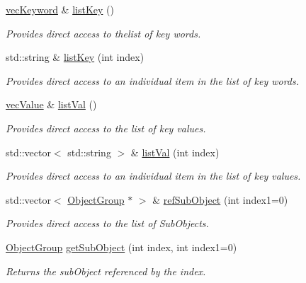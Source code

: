 \begin{DoxyCompactItemize}
\hyperlink{namespaceosea_af47d453cb217c2c461685cd6e754c070}{vec\-Keyword} \& \hyperlink{classosea_1_1_parser_a2ffe797d5380aed4e9a9dd400e8ab79d}{list\-Key} ()
\begin{DoxyCompactList}\small\item\em Provides direct access to thelist of key words. \end{DoxyCompactList}\item 
std\-::string \& \hyperlink{classosea_1_1_parser_a3b378364d4b4c3f58f7b3ea7e156ac98}{list\-Key} (int index)
\begin{DoxyCompactList}\small\item\em Provides direct access to an individual item in the list of key words. \end{DoxyCompactList}\item 
\hyperlink{namespaceosea_ae7c5f2bab0fab3931b2ef51a0ad04cc2}{vec\-Value} \& \hyperlink{classosea_1_1_parser_ac8e87b248b0a427add910f8f7f72183d}{list\-Val} ()
\begin{DoxyCompactList}\small\item\em Provides direct access to the list of key values. \end{DoxyCompactList}\item 
std\-::vector$<$ std\-::string $>$ \& \hyperlink{classosea_1_1_parser_a312496911fbc7212187b7638a61d8227}{list\-Val} (int index)
\begin{DoxyCompactList}\small\item\em Provides direct access to an individual item in the list of key values. \end{DoxyCompactList}\item 
std\-::vector$<$ \hyperlink{classosea_1_1_object_group}{Object\-Group} $\ast$ $>$ \& \hyperlink{classosea_1_1_parser_a4e0dcef1ae5785c46f2fb6d935090595}{ref\-Sub\-Object} (int index1=0)
\begin{DoxyCompactList}\small\item\em Provides direct access to the list of Sub\-Objects. \end{DoxyCompactList}\item 
\hyperlink{classosea_1_1_object_group}{Object\-Group} \hyperlink{classosea_1_1_parser_aac0035a33352c645ef101d9dc52008db}{get\-Sub\-Object} (int index, int index1=0)
\begin{DoxyCompactList}\small\item\em Returns the sub\-Object referenced by the index. \end{DoxyCompactList}\end{DoxyCompactItemize}
